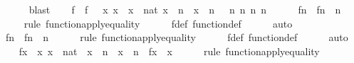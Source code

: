 \begin{isabellebody}
\ \ \ \ \isamarkupfalse%
\ blast\isanewline
\isanewline
\ \ \isamarkupfalse%
\ f\ \ {\isachardoublequoteopen}f\ {\isasymequiv}\ {\isacharbraceleft}{\kern0pt}\ {\isacharless}{\kern0pt}x{\isacharcomma}{\kern0pt}\ x{\isachargreater}{\kern0pt}\ {\isachardot}{\kern0pt}{\isachardot}{\kern0pt}\ x\ {\isasymin}\ nat{\isacharcomma}{\kern0pt}\ x\ {\isasymnoteq}\ n\ {\isasymand}\ x\ {\isasymnoteq}\ n{\isacharprime}{\kern0pt}{\isacharbraceright}{\kern0pt}\ {\isasymunion}\ {\isacharbraceleft}{\kern0pt}\ {\isacharless}{\kern0pt}n{\isacharcomma}{\kern0pt}\ n{\isacharprime}{\kern0pt}{\isachargreater}{\kern0pt}{\isacharcomma}{\kern0pt}\ {\isacharless}{\kern0pt}n{\isacharprime}{\kern0pt}{\isacharcomma}{\kern0pt}\ n{\isachargreater}{\kern0pt}\ {\isacharbraceright}{\kern0pt}{\isachardoublequoteclose}\ \isanewline
\isanewline
\ \ \isamarkupfalse%
\ fn\ {\isacharcolon}{\kern0pt}\ {\isachardoublequoteopen}f{\isacharbackquote}{\kern0pt}n\ {\isacharequal}{\kern0pt}\ n{\isacharprime}{\kern0pt}{\isachardoublequoteclose}\ \isanewline
\ \ \ \ \isamarkupfalse%
{\isacharparenleft}{\kern0pt}rule\ function{\isacharunderscore}{\kern0pt}apply{\isacharunderscore}{\kern0pt}equality{\isacharparenright}{\kern0pt}\isanewline
\ \ \ \ \isamarkupfalse%
\ f{\isacharunderscore}{\kern0pt}def\ function{\isacharunderscore}{\kern0pt}def\isanewline
\ \ \ \ \isamarkupfalse%
\ auto\isanewline
\ \ \isamarkupfalse%
\ fn{\isacharprime}{\kern0pt}\ {\isacharcolon}{\kern0pt}\ {\isachardoublequoteopen}f{\isacharbackquote}{\kern0pt}n{\isacharprime}{\kern0pt}\ {\isacharequal}{\kern0pt}\ n{\isachardoublequoteclose}\ \isanewline
\ \ \ \ \isamarkupfalse%
{\isacharparenleft}{\kern0pt}rule\ function{\isacharunderscore}{\kern0pt}apply{\isacharunderscore}{\kern0pt}equality{\isacharparenright}{\kern0pt}\isanewline
\ \ \ \ \isamarkupfalse%
\ f{\isacharunderscore}{\kern0pt}def\ function{\isacharunderscore}{\kern0pt}def\isanewline
\ \ \ \ \isamarkupfalse%
\ auto\isanewline
\ \ \isamarkupfalse%
\ fx\ {\isacharcolon}{\kern0pt}\ {\isachardoublequoteopen}{\isasymAnd}x{\isachardot}{\kern0pt}\ x\ {\isasymin}\ nat\ {\isasymLongrightarrow}\ x\ {\isasymnoteq}\ n\ {\isasymLongrightarrow}\ x\ {\isasymnoteq}\ n{\isacharprime}{\kern0pt}\ {\isasymLongrightarrow}\ f{\isacharbackquote}{\kern0pt}x\ {\isacharequal}{\kern0pt}\ x{\isachardoublequoteclose}\ \isanewline
\ \ \ \ \isamarkupfalse%
{\isacharparenleft}{\kern0pt}rule\ function{\isacharunderscore}{\kern0pt}apply{\isacharunderscore}{\kern0pt}equality{\isacharparenright}{\kern0pt}\isanewline

\end{isabellebody}
